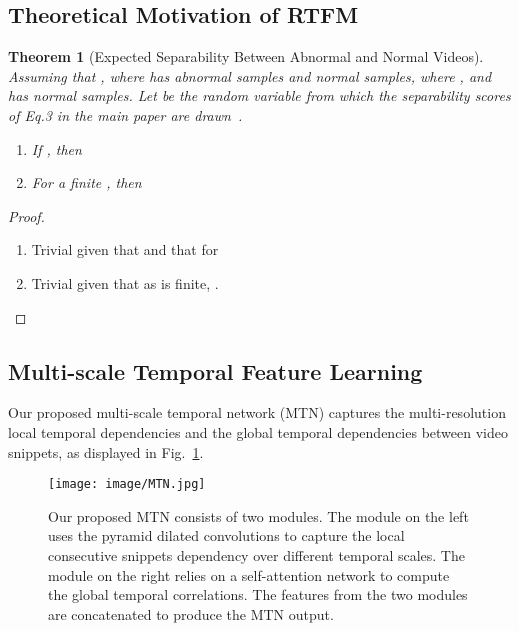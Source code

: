 \documentclass[final]{cvpr}
\newtheorem{theorem}{Theorem}[section]
\begin{document}
\subsection{Theoretical Motivation of RTFM}

\begin{theorem}[Expected Separability Between Abnormal and Normal Videos]
\label{thm:expected_separability}
Assuming that , where  has  abnormal samples and  normal samples, where , and  has  normal samples.
Let  be the random variable from which the separability scores  of Eq.3 in the main paper are drawn~\cite{li2015multiple}.
\begin{enumerate}
    \item If  , then
    
    \item For a finite , then
    
\end{enumerate}
\end{theorem}
\begin{proof}


\begin{enumerate}
\item Trivial given that
 and that  for 
\item Trivial given that as  is finite, .
\end{enumerate}
\end{proof}

\subsection{Multi-scale Temporal Feature Learning}

Our proposed multi-scale temporal network (MTN) captures the multi-resolution local temporal dependencies and the global temporal dependencies between video snippets, as displayed in Fig.~\ref{fig:MTN}.

\begin{figure}[t!]
\begin{center}
\texttt{[image: image/MTN.jpg]}
\end{center}
  \caption{Our proposed MTN consists of two modules. The module on the left uses the pyramid dilated convolutions to capture the local consecutive snippets dependency over different temporal scales. The module on the right relies on a self-attention network to compute the global temporal correlations. The features from the two modules are concatenated to produce the MTN output.}
\label{fig:MTN}
\end{figure}
\end{document}
